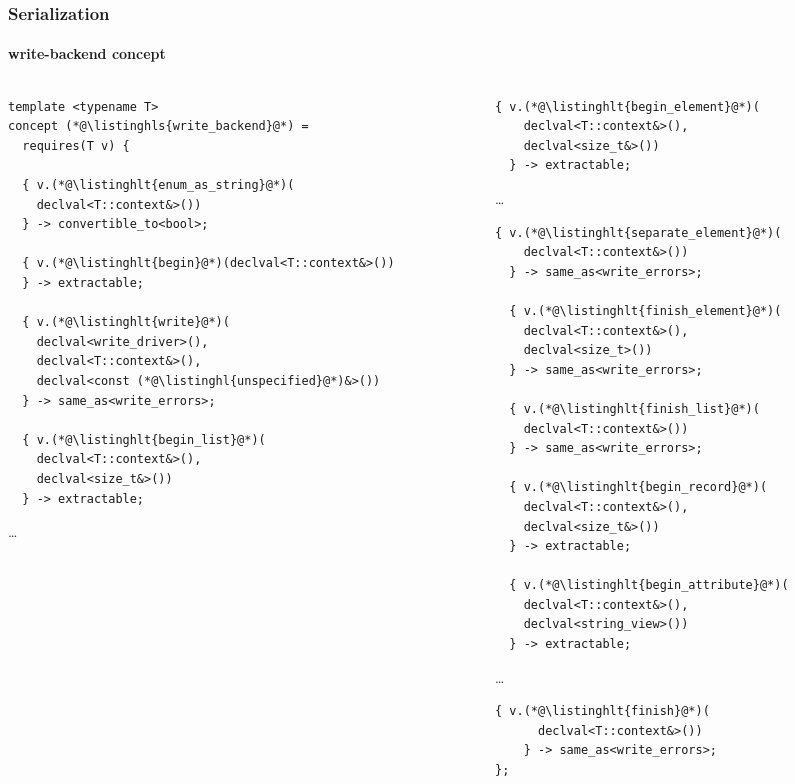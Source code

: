 \documentclass[compress,table,xcolor=table]{beamer}
\begin{document}
\begin{frame}[fragile]
  \frametitle{Serialization}
  \framesubtitle{write-backend concept}
  \smaller
  \begin{columns}
    \begin{column}{.65\textwidth}
      \begin{lstlisting}[language=c++2x,basicstyle=\scriptsize\ttfamily]
template <typename T>
concept (*@\listinghls{write_backend}@*) =
  requires(T v) {

  { v.(*@\listinghlt{enum_as_string}@*)(
    declval<T::context&>())
  } -> convertible_to<bool>;

  { v.(*@\listinghlt{begin}@*)(declval<T::context&>())
  } -> extractable;

  { v.(*@\listinghlt{write}@*)(
    declval<write_driver>(),
    declval<T::context&>(),
    declval<const (*@\listinghl{unspecified}@*)&>())
  } -> same_as<write_errors>;

  { v.(*@\listinghlt{begin_list}@*)(
    declval<T::context&>(),
    declval<size_t&>())
  } -> extractable;
      \end{lstlisting}
      \ldots
    \end{column}
    \begin{column}{.35\textwidth}
      \begin{lstlisting}[language=c++2x,basicstyle=\tiny\ttfamily]
  { v.(*@\listinghlt{begin_element}@*)(
    declval<T::context&>(),
    declval<size_t&>())
  } -> extractable;
      \end{lstlisting}
      \ldots
      \begin{lstlisting}[language=c++2x,basicstyle=\miniscule\ttfamily]
  { v.(*@\listinghlt{separate_element}@*)(
    declval<T::context&>())
  } -> same_as<write_errors>;

  { v.(*@\listinghlt{finish_element}@*)(
    declval<T::context&>(),
    declval<size_t>())
  } -> same_as<write_errors>;

  { v.(*@\listinghlt{finish_list}@*)(
    declval<T::context&>())
  } -> same_as<write_errors>;

  { v.(*@\listinghlt{begin_record}@*)(
    declval<T::context&>(),
    declval<size_t&>())
  } -> extractable;

  { v.(*@\listinghlt{begin_attribute}@*)(
    declval<T::context&>(),
    declval<string_view>())
  } -> extractable;
      \end{lstlisting}
      \ldots
      \begin{lstlisting}[language=c++2x,basicstyle=\miniscule\ttfamily]
    { v.(*@\listinghlt{finish}@*)(
      declval<T::context&>())
    } -> same_as<write_errors>;
};
      \end{lstlisting}
    \end{column}
  \end{columns}
\end{frame}
\end{document}
